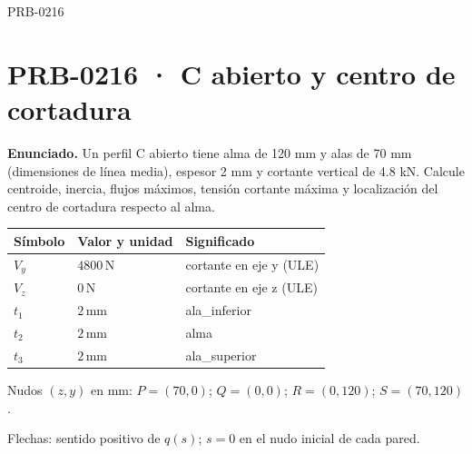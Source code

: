 \begin{studiumworked}{PRB-0216}

\section{PRB-0216 · C abierto y centro de cortadura}

\textbf{Enunciado.} Un perfil C abierto tiene alma de 120 mm y alas de 70 mm (dimensiones de línea media), espesor 2 mm y cortante vertical de 4.8 kN. Calcule centroide, inercia, flujos máximos, tensión cortante máxima y localización del centro de cortadura respecto al alma.

\par\medskip\noindent\begin{tabular}{@{}p{.18\linewidth}p{.26\linewidth}p{.48\linewidth}@{}}
\toprule Símbolo & Valor y unidad & Significado\\\midrule
$V_{y}$ & $4800\,\mathrm{N}$ & cortante en eje y (ULE)\\
$V_{z}$ & $0\,\mathrm{N}$ & cortante en eje z (ULE)\\
$t_{1}$ & $2\,\mathrm{mm}$ & ala\_inferior\\
$t_{2}$ & $2\,\mathrm{mm}$ & alma\\
$t_{3}$ & $2\,\mathrm{mm}$ & ala\_superior\\
\bottomrule\end{tabular}\par\medskip

\par\medskip\noindent\begin{minipage}{\linewidth}\centering
{}
\par\small Nudos $(z,y)$ en mm: $P=(70,0)$; $Q=(0,0)$; $R=(0,120)$; $S=(70,120)$.
\par\small Flechas: sentido positivo de $q(s)$; $s=0$ en el nudo inicial de cada pared.
\par\normalsize\end{minipage}\par\medskip


\end{studiumworked}
